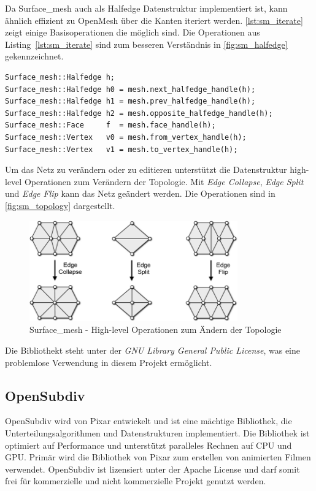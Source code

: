 Da Surface\_mesh auch als Halfedge Datenstruktur implementiert ist, kann ähnlich effizient zu OpenMesh über die Kanten iteriert werden.
\autoref{lst:sm_iterate} zeigt einige Basisoperationen die möglich sind.
Die Operationen aus Listing~\ref{lst:sm_iterate} sind zum besseren Verständnis in \autoref{fig:sm_halfedge} gekennzeichnet. 

\begin{lstlisting}[style=myCppStyle, caption=Surface\_mesh - Basisoperationen, label=lst:sm_iterate]
Surface_mesh::Halfedge h;
Surface_mesh::Halfedge h0 = mesh.next_halfedge_handle(h);
Surface_mesh::Halfedge h1 = mesh.prev_halfedge_handle(h);
Surface_mesh::Halfedge h2 = mesh.opposite_halfedge_handle(h);
Surface_mesh::Face     f  = mesh.face_handle(h);
Surface_mesh::Vertex   v0 = mesh.from_vertex_handle(h);
Surface_mesh::Vertex   v1 = mesh.to_vertex_handle(h);
\end{lstlisting}

Um das Netz zu verändern oder zu editieren unterstützt die Datenstruktur high-level Operationen zum Verändern der Topologie.
Mit \emph{Edge Collapse}, \emph{Edge Split} und \emph{Edge Flip} kann das Netz geändert werden.
Die Operationen sind in \autoref{fig:sm_topology} dargestellt. 

\begin{figure}
    \centering
  \includegraphics[width=0.8\textwidth]{content/media/sm_topology-changes}
  \caption{Surface\_mesh - High-level Operationen zum Ändern der Topologie \cite{OpenGP.24.07.2015}}
  \label{fig:sm_topology}
\end{figure}

Die Bibliothekt steht unter der \emph{GNU Library General Public License}, was eine problemlose Verwendung in diesem Projekt ermöglicht.

\subsection{OpenSubdiv}

OpenSubdiv wird von Pixar entwickelt und ist eine mächtige Bibliothek, die Unterteilungsalgorithmen und Datenstrukturen implementiert.
Die Bibliothek ist optimiert auf Performance und unterstützt paralleles Rechnen auf CPU und GPU.
Primär wird die Bibliothek von Pixar zum erstellen von animierten Filmen verwendet.
OpenSubdiv ist lizensiert unter der Apache License und darf somit frei für kommerzielle und nicht kommerzielle Projekt genutzt werden.

